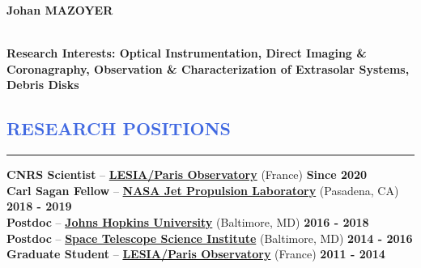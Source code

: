 \documentclass[11pt]{article}
\begin{document}
\lhead[]{}
\lfoot{\textcolor{Gray}{CV last update: \yeardate\today}}

\begin{huge}
\noindent\textbf{Johan MAZOYER}
\end{huge}\\


\textbf{Research Interests: Optical Instrumentation, Direct Imaging \& Coronagraphy,
Observation \& Characterization of Extrasolar Systems, Debris Disks}\\


\vspace{-1cm}
\textcolor{RoyalBlue}{\section{\large RESEARCH POSITIONS}
\vspace{-0.35cm}\hrule}
\vspace{0.4cm}

\textbf{CNRS Scientist} --
\href{http://www.obspm.fr/?lang=en}{\textbf{LESIA/Paris Observatory}} (France)
\hfill     	 { \bf Since 2020}\\


\textbf{Carl Sagan Fellow} --
\href{https://www.jpl.nasa.gov/}{\textbf{NASA Jet Propulsion Laboratory}} (Pasadena, CA)
\hfill      { \bf 2018 - 2019}\\


\textbf{Postdoc} --
\href{http://physics-astronomy.jhu.edu/}{\textbf{Johns Hopkins University}} (Baltimore, MD)
\hfill   	 { \bf 2016 - 2018}\\


\textbf{Postdoc} --
{\href{http://www.stsci.edu}{\textbf{Space Telescope Science Institute}}} (Baltimore, MD)
\hfill        { \bf 2014 - 2016}\\

\textbf{Graduate Student} --
\href{http://www.obspm.fr/?lang=en}{\textbf{LESIA/Paris Observatory}} (France)
\hfill        { \bf 2011 - 2014}\\
\end{document}
